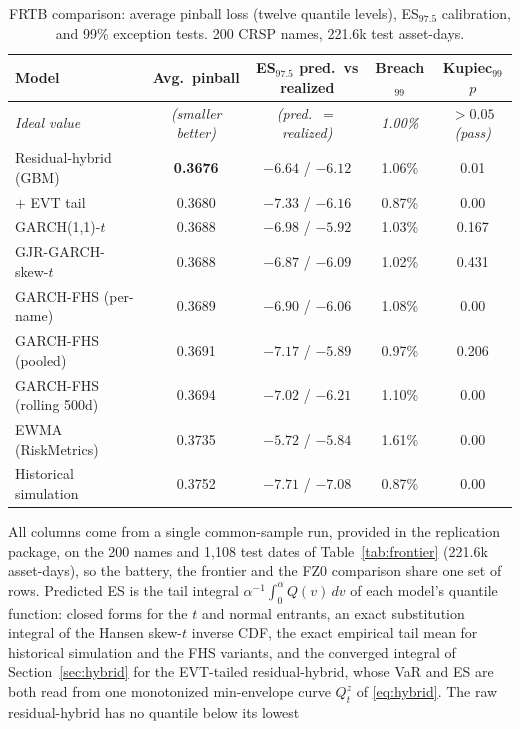 \documentclass[11pt]{article}
\theoremstyle{remark}
\begin{document}
\begin{table}[t]
\centering
\begin{threeparttable}
\caption{FRTB comparison: average pinball loss (twelve quantile levels),
ES$_{97.5}$ calibration, and 99\% exception tests. 200 CRSP names, 221.6k
test asset-days.}
\label{tab:frtb}
\small\setlength{\tabcolsep}{4.5pt}
\begin{tabular}{lcccc}
\toprule
Model & Avg.\ pinball & ES$_{97.5}$ pred.\ vs realized & Breach$_{99}$ & Kupiec$_{99}$ $p$ \\
\midrule
\emph{Ideal value} & \emph{(smaller better)} & \emph{(pred.\ $=$ realized)} & \emph{1.00\%} & \emph{$>0.05$ (pass)} \\
\midrule
Residual-hybrid (GBM) & \textbf{0.3676} & $-6.64$ / $-6.12$ & 1.06\% & 0.01 \\
\quad $+$ EVT tail & 0.3680 & $-7.33$ / $-6.16$ & 0.87\% & 0.00 \\
GARCH(1,1)-$t$ & 0.3688 & $-6.98$ / $-5.92$ & 1.03\% & 0.167 \\
GJR-GARCH-skew-$t$ & 0.3688 & $-6.87$ / $-6.09$ & 1.02\% & 0.431 \\
GARCH-FHS (per-name) & 0.3689 & $-6.90$ / $-6.06$ & 1.08\% & 0.00 \\
GARCH-FHS (pooled) & 0.3691 & $-7.17$ / $-5.89$ & 0.97\% & 0.206 \\
GARCH-FHS (rolling 500d) & 0.3694 & $-7.02$ / $-6.21$ & 1.10\% & 0.00 \\
EWMA (RiskMetrics) & 0.3735 & $-5.72$ / $-5.84$ & 1.61\% & 0.00 \\
Historical simulation & 0.3752 & $-7.71$ / $-7.08$ & 0.87\% & 0.00 \\
\bottomrule
\end{tabular}
\begin{tablenotes}\footnotesize
\item All columns come from a single common-sample run, provided in
the replication package, on the 200 names and 1{,}108 test dates of
Table~\ref{tab:frontier} (221.6k asset-days), so the battery, the
frontier and the FZ0 comparison share one set of rows.
Predicted ES is the tail integral
$\alpha^{-1}\!\int_0^\alpha Q(v)\,dv$ of each model's quantile function: closed forms for the $t$ and
normal entrants, an exact substitution integral of the Hansen skew-$t$ inverse
CDF, the exact empirical tail mean for historical simulation and the FHS variants, and the converged integral of
Section~\ref{sec:hybrid} for the EVT-tailed residual-hybrid, whose VaR and ES are both read from
one monotonized min-envelope curve $Q^{z}_t$ of \eqref{eq:hybrid}. The raw residual-hybrid has no quantile below its lowest

\end{tablenotes}
\end{threeparttable}
\end{table}
\end{document}
